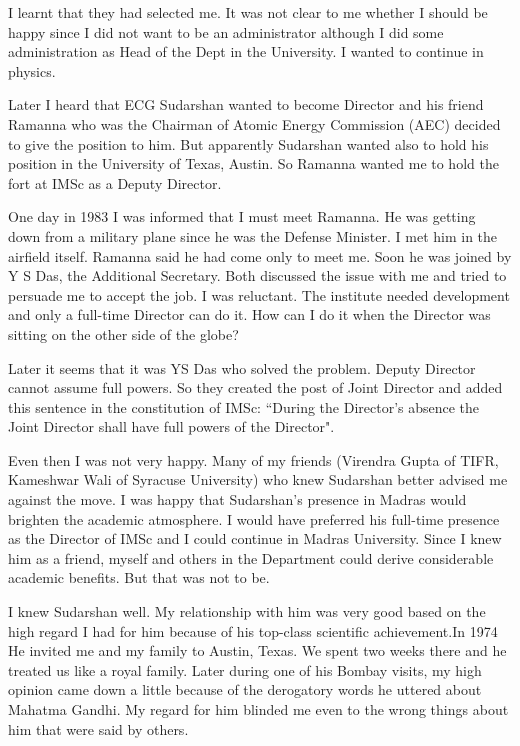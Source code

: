 I learnt that they had selected me. It was not clear to me whether I 
should be happy since I did not want to be an administrator although I 
did some administration as Head of the Dept in the University. I wanted 
to continue in physics.

Later I heard that ECG Sudarshan wanted to become Director and his 
friend Ramanna who was the Chairman of Atomic Energy Commission (AEC) 
decided to give the position to him. But apparently Sudarshan wanted 
also to hold his position in the University of Texas, Austin. So Ramanna 
wanted me to hold the fort at IMSc as a Deputy Director.

One day in 1983 I was informed that I must meet Ramanna. He was getting 
down from a military plane since he was the Defense Minister. I met him 
in the airfield itself. Ramanna said he had come only to meet me. Soon 
he was joined by Y S Das, the Additional Secretary. Both discussed the 
issue with me and tried to persuade me to accept the job. I was 
reluctant. The institute needed development and only a full-time 
Director can do it. How can I do it when the Director was sitting on the 
other side of the globe?

Later it seems that it was YS Das who solved the problem. Deputy 
Director cannot assume full powers. So they created the post of Joint 
Director and added this sentence in the constitution of IMSc: ``During 
the Director's absence the Joint Director shall have full powers of the 
Director".

Even then I was not very happy. Many of my friends (Virendra Gupta of 
TIFR, Kameshwar Wali of Syracuse University) who knew Sudarshan better 
advised me against the move. I was happy that Sudarshan's presence in 
Madras would brighten the academic atmosphere. I would have preferred 
his full-time presence as the Director of IMSc and I could continue in 
Madras University. Since I knew him as a friend, myself and others in 
the Department could derive considerable academic benefits. But that was 
not to be.

I knew Sudarshan well. My relationship with him was very good based on 
the high regard I had for him because of his top-class scientific 
achievement.In 1974 He invited me and my family to Austin, Texas. We 
spent two weeks there and he treated us like a royal family. Later 
during one of his Bombay visits, my high opinion came down a little 
because of the derogatory words he uttered about Mahatma Gandhi. My 
regard for him blinded me even to the wrong things about him that were 
said by others.

